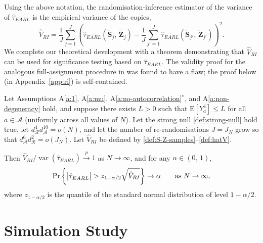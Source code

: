 \documentclass[sigconf,nonacm]{acmart}
\newcommand{\E}{\mathrm E}
\DeclareMathOperator{\var}{var}
\begin{document}
Using the above notation, the randomisation-inference estimator of the variance of $\hat\tau^{\phantom{1}}_{EARL}$ is the empirical variance of the copies,
\begin{equation}\label{def:hatV}
    \hat V_{RI} = \frac{1}{J} \sum_{j=1}^J\left(\hat\tau^{\phantom{1}}_{EARL}(\tilde {\mathbf S}_j,\,\tilde{\mathbf Z}_j)-\frac 1 J\sum_{j'=1}^J\hat\tau^{\phantom{1}}_{EARL}(\tilde {\mathbf S}_{j'},\,\tilde{\mathbf Z}_{j'})\right)^2.
\end{equation}
We complete our theoretical development with a theorem demonstrating that $\hat V_{RI}$ can be used for significance testing based on $\hat\tau^{\phantom{1}}_{EARL}$. The validity proof for the analogous full-assignment procedure in \cite{shi2025scalableanalysisbipartiteexperiments} was found to have a flaw; the proof below (in Appendix~\ref{app:ri}) is self-contained.

\begin{theorem}\label{th:randomisation-inference}
    Let Assumptions A\ref{a:1}, A\ref{a:mu}, A\ref{a:no-autocorrelation}$^*$, and A\ref{a:non-degeneracy} hold, and suppose there exists $L>0$ such that $\E[Y_a^4] \le L$ for all $a\in\mathcal A$ (uniformly across all values of $N$). Let the strong null \eqref{def:strong-null} hold true, let $d^{4}_{\mathcal{R}}d^{10}_{\mathcal{A}}=o(N)$, and let the number of re-randomisations $J=J_N$ grow so that $d^{6}_{\mathcal{A}}d^{2}_{\mathcal{R}}=o(J_N)$. Let $\hat V_{RI}$ be defined by \eqref{def:S-Z-samples}--\eqref{def:hatV}.

    Then $\hat V_{RI} / \var(\hat\tau^{\phantom{1}}_{EARL})\stackrel{p}{\to} 1$ as $N\to\infty$, and
    for any $\alpha\in(0,\,1)$,
    \begin{equation*}
        \Pr\left\{\left|\hat\tau^{\phantom{1}}_{EARL}\right| > z_{1-\alpha/2}\sqrt{\hat V_{RI}}\right\}\to \alpha \qquad \textup{as }N\to\infty,
    \end{equation*}
    where $z_{1-\alpha/2}$ is the quantile of the standard normal distribution of level $1-\alpha/2$.
\end{theorem}

\section{Simulation Study}\label{sec:simulations}
\end{document}
